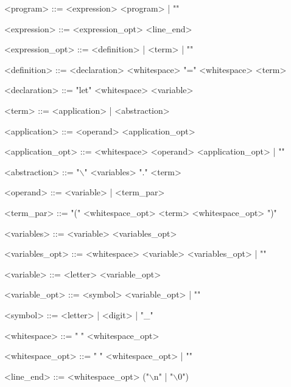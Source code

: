 \documentclass[12pt]{article}
\begin{document}
<program> ::= <expression> <program> | ""

<expression> ::= <expression\_opt> <line\_end>

<expression\_opt> ::= <definition> | <term> | ""

<definition> ::= <declaration> <whitespace> "=" <whitespace> <term>

<declaration> ::= "let" <whitespace> <variable>

<term> ::= <application> | <abstraction>

<application> ::= <operand> <application\_opt>

<application\_opt> ::= <whitespace> <operand> <application\_opt> | ""

<abstraction> ::= "$\backslash$" <variables> "." <term>

<operand> ::= <variable> | <term\_par>

<term\_par> ::= "(" <whitespace\_opt> <term> <whitespace\_opt> ")"

<variables> ::= <variable> <variables\_opt>

<variables\_opt> ::= <whitespace> <variable> <variables\_opt> | ""

<variable> ::= <letter> <variable\_opt>

<variable\_opt> ::= <symbol> <variable\_opt> | ""

<symbol> ::= <letter> | <digit> | "\_"

<whitespace> ::= " " <whitespace\_opt>

<whitespace\_opt> ::= " " <whitespace\_opt> | ""

<line\_end> ::= <whitespace\_opt> ("$\backslash$n" | "$\backslash$0")
\end{document}
